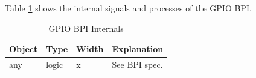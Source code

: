 
Table \ref{tab:asGpioPer07} shows the internal signals and processes of the GPIO BPI.
\begin{table}[H]
\caption{GPIO BPI Internals}
\label{tab:asGpioPer07}
\centering
\begin{tabularx}{\textwidth}{|l |l |l |X|}
  \hline
  Object & Type & Width & Explanation \\
  \hline
  \hline
  any & logic & x & See BPI spec. \\
  \hline
\end{tabularx}
\end{table}

